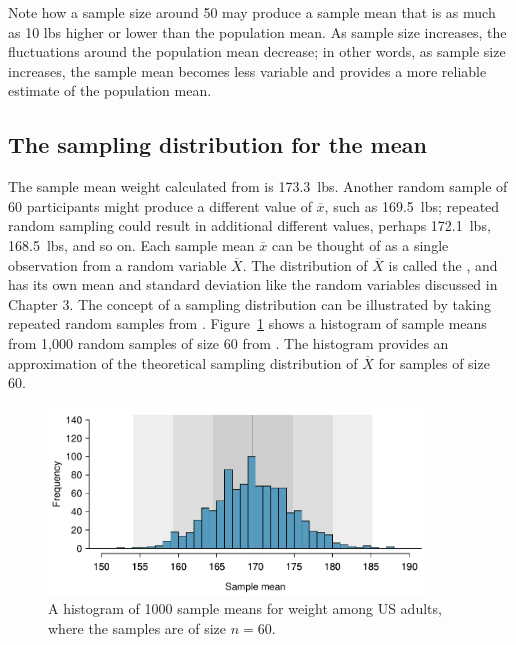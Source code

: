 Note how a sample size around 50 may produce a sample mean that is as much as 10 lbs higher or lower than the population mean. As sample size increases, the fluctuations around the population mean decrease; in other words, as sample size increases, the sample mean becomes less variable and provides a more reliable estimate of the population mean.


\subsection{The sampling distribution for the mean}

The sample mean weight calculated from  is 173.3~lbs. Another random sample of 60 participants might produce a different value of $\overline{x}$, such as 169.5~lbs; repeated random sampling could result in additional different values, perhaps 172.1~lbs, 168.5~lbs, and so on. Each sample mean $\overline{x}$ can be thought of as a single observation from a random variable $\overline{X}$. The distribution of $\overline{X}$ is called the , and has its own mean and standard deviation like the random variables discussed in Chapter 3. The concept of a sampling distribution can be illustrated by taking repeated random samples from . Figure~\ref{cdcWeight1000SampDist} shows a histogram of sample means from 1,000 random samples of size 60 from . The histogram provides an approximation of the theoretical sampling distribution of $\overline{X}$ for samples of size 60. 

\begin{figure}[h]
	\centering
	\includegraphics[width=0.9\textwidth]
	{ch_inference_foundations_oi_biostat/figures/cdcWeight1000SampDist/cdcWeight1000SampDist}
	\caption{A histogram of 1000 sample means for weight among US adults, where the samples are of size $n=60$.}
	\label{cdcWeight1000SampDist}
\end{figure}

